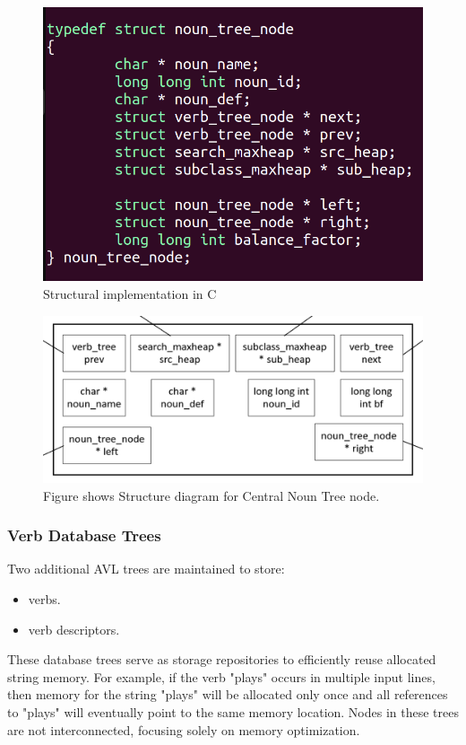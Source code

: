 \documentclass[conference]{IEEEtran}
\begin{document}
\begin{figure}[htbp]
\centering
\includegraphics[width=0.8\linewidth]{c1.png} %
\caption{Structural implementation in C}
\label{fig}
\end{figure}


\begin{figure}[htbp]
\centering
\includegraphics[width=0.8\linewidth]{fig_2_2.png} %
\caption{Figure shows Structure diagram for Central Noun Tree node.}
\label{fig}
\end{figure}



\subsubsection{Verb Database Trees}
Two additional AVL trees are maintained to store:
\begin{itemize}
    \item verbs.
    \item verb descriptors.
\end{itemize}
These database trees serve as storage repositories to efficiently reuse allocated string memory. 
For example, if the verb "plays" occurs in multiple input lines, then memory for the string "plays" will be allocated only once and all references to "plays" will eventually point to the same memory location. 
Nodes in these trees are not interconnected, focusing solely on memory optimization.
\end{document}
